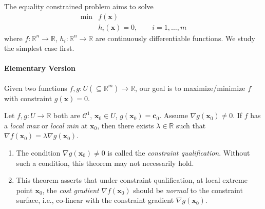 The equality constrained problem aims to solve
\begin{equation}
\begin{array}{ll}
\min&f(\bm x)\\
&h_i(\bm x)=0,\qquad i=1,\dots,m
\end{array}
\end{equation}
where $f:\mathbb{R}^n\to\mathbb{R}$, $h_i:\mathbb{R}^n\to\mathbb{R}$ are continuously differentiable functions. We study the simplest case first.
\paragraph{Elementary Version}
Given two functions $f,g:U(\subseteq\mathbb{R}^m)\to\mathbb{R}$, our goal is to maximize/minimize $f$ with constraint $g(\bm x)=0$.

\begin{theorem}
Let $f,g:U\to\mathbb{R}$ both are $\mathcal{C}^1$, $\bm x_0\in U$, $g(\bm x_0)=\bm c_0$. Assume $\nabla g(\bm x_0)\ne0$. If $f$ has a \emph{local max} or \emph{local min} at $\bm x_0$, then there exists $\lambda\in\mathbb{R}$ such that $\nabla f(\bm x_0)=\lambda\nabla g(\bm x_0)$.
\end{theorem}
\begin{remark}
\begin{enumerate}
\item
The condition $\nabla g(\bm x_0)\ne0$ is called the \emph{constraint qualification}. Without such a condition, this theorem may not necessarily hold.
\item
This theorem asserts that under constraint qualification, at local extreme point $\bm x_0$, the \emph{cost gradient} $\nabla f(\bm x_0)$ should be \emph{normal} to the constraint surface, i.e., co-linear with the constraint gradient $\nabla g(\bm x_0)$.
\end{enumerate}
\end{remark}





